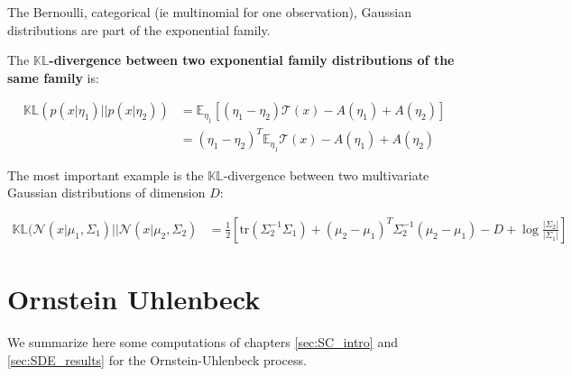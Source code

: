 The Bernoulli, categorical (ie multinomial for one observation), Gaussian distributions are part of the exponential family.

The \textbf{$\mathbb{KL}$-divergence between two exponential family distributions of the same family} is:

\begin{align}
    \mathbb{KL}(p(x\vert \eta_1) \vert \vert p(x \vert \eta_2)) &= \mathbb{E}_{\eta_1}\left[ (\eta_1 - \eta_2) \mathcal{T}(x) - A(\eta_1) + A(\eta_2)\right] \\
    &= (\eta_1 - \eta_2)^T \mathbb{E}_{\eta_1}\mathcal{T}(x) - A(\eta_1) + A(\eta_2)
\end{align}

The most important example is the $\mathbb{KL}$-divergence between two multivariate Gaussian distributions of dimension $D$:

\begin{tcolorbox}[colback=blue!5!white,colframe=black!75!black,title=KL between two multivariate Gaussians of dimension $D$]
\begin{align}
    \label{KL-two-gaussians}
    \mathbb{KL}(\mathcal{N}(x \vert \mu_1, \Sigma_1) \vert\vert \mathcal{N}(x \vert \mu_2, \Sigma_2) &=
    \frac{1}{2}\left[ \text{tr}(\Sigma_2^{-1}\Sigma_1) + (\mu_2-\mu_1)^T \Sigma_2^{-1}(\mu_2-\mu_1) -D + \log{\frac{\vert \Sigma_2\vert}{\vert \Sigma_1 \vert}}\right]
\end{align}
\end{tcolorbox}


%
%

\chapter{Ornstein Uhlenbeck}\label{Ornstein Uhlenbeck}

We summarize here some computations of chapters \ref{sec:SC_intro} and \ref{sec:SDE_results} for the Ornstein-Uhlenbeck process.


